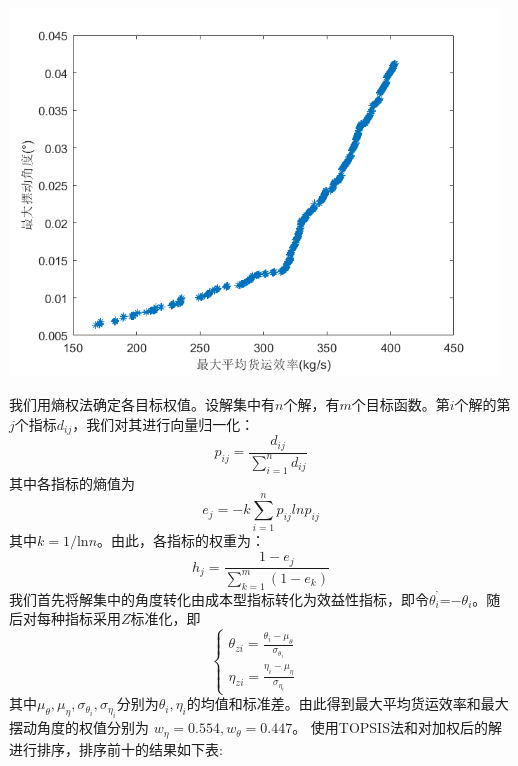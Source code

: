 \documentclass[withoutpreface,bwprint]{cumcmthesis} %
\begin{document}
\centerline{\includegraphics[width=13cm]{p3demo.png}}

我们用熵权法确定各目标权值。设解集中有$n$个解，有$m$个目标函数。第$i$个解的第$j$个指标$d_{ij}$，我们对其进行向量归一化：
$$p_{ij}=\frac{d_{ij}}{\sum_{i=1}^{n}d_{ij}}$$
其中各指标的熵值为
$$e_j=-k\sum_{i=1}^{n}p_{ij}lnp_{ij}$$
其中$k=1/$ln$n$。由此，各指标的权重为：
$$h_j=\frac{1-e_j}{\sum_{k=1}^{m}(1-e_k)}$$
我们首先将解集中的角度转化由成本型指标转化为效益性指标，即令$\theta_i^’$=$-\theta_i$。随后对每种指标采用$Z$标准化，即
$$\left\{\begin{matrix}
 \theta_{zi}=\frac{\theta_i-\mu _\theta}{\sigma _{\theta_i}}&\\
 \eta _{zi}=\frac{\eta_i-\mu _\eta}{\sigma _{\eta_i}}& 
\end{matrix}\right.$$
其中$\mu _\theta,\mu _\eta,\sigma _{\theta_i},\sigma _{\eta_i}$分别为$\theta_i,\eta_i$的均值和标准差。由此得到最大平均货运效率和最大摆动角度的权值分别为
$w_\eta=0.554,w_\theta=0.447$。
使用TOPSIS法和对加权后的解进行排序，排序前十的结果如下表:
\end{document}
